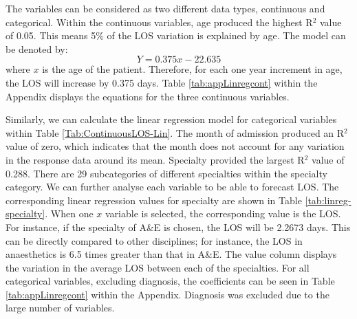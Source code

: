 \documentclass[../thesis.tex]{subfiles}
\begin{document}
The variables can be considered as two different data types, continuous and categorical. Within the continuous variables, age produced the highest R$^{2}$ value of 0.05. This means 5\% of the LOS variation is explained by age. The model can be denoted by: 
\begin{equation}
    Y = 0.375x - 22.635
\end{equation}
where $x$ is the age of the patient.
Therefore, for each one year increment in age, the LOS will increase by 0.375 days. Table \ref{tab:appLinregcont} within the Appendix displays the equations for the three continuous variables.

Similarly, we can calculate the linear regression model for categorical variables within Table \ref{Tab:ContinuousLOS-Lin}. The month of admission produced an R$^{2}$ value of zero, which indicates that the month does not account for any variation in the response data around its mean. Specialty provided the largest R$^{2}$ value of 0.288. There are 29 subcategories of different specialties within the specialty category. We can further analyse each variable to be able to forecast LOS. The corresponding linear regression values for specialty are shown in Table \ref{tab:linreg-specialty}. When one $x$ variable is selected, the corresponding value is the LOS. For instance, if the specialty of A\&E is chosen, the LOS will be 2.2673 days. This can be directly compared to other disciplines; for instance, the LOS in anaesthetics is 6.5 times greater than that in A\&E. The value column displays the variation in the average LOS between each of the specialties. For all categorical variables, excluding diagnosis, the coefficients can be seen in Table \ref{tab:appLinregcont} within the Appendix. Diagnosis was excluded due to the large number of variables.
\end{document}
